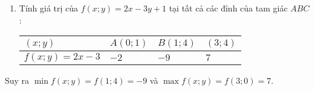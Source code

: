 \begin{ex}
{\begin{enumerate}[--]
\begin{enumerate}[+]
        \item $\big\{B\big\}=d_1 \cap d_2$ nên tọa độ của nó là nghiệm của hệ $\heva{&3x-y=-1\\&2x+y=6} \Leftrightarrow \heva{&x=1\\&y=4}$. Vậy $B(1;4)$.\\
        \item $\big\{C\big\}=d_2 \cap d_3$ nên tọa độ của nó là nghiệm của hệ $\heva{&2x+y=6\\&x+3y=3} \Leftrightarrow \heva{&x=3\\&y=0}$. Vậy $C(3;0)$.\\      
        \end{enumerate}
        \item Tính giá trị của $f(x;y)=2x-3y+1$ tại tất cả các đỉnh của tam giác $ABC$:
        \begin{center}
            \begin{tabular}{|>{\centering\arraybackslash}p{3cm}|>{\centering\arraybackslash}p{3cm}|>{\centering\arraybackslash}p{3cm}|>{\centering\arraybackslash}p{3cm}|}
                \hline
                $(x;y)$&$A(0;1)$  &$B(1;4)$  & $(3;4)$ \\
                \hline
                $f(x;y)=2x-3$&$-2$  &$-9$  &$7$  \\
                \hline
            \end{tabular}
        \end{center}    
    \end{enumerate}
        Suy ra $\min f(x;y)=f(1;4)=-9$ và $\max f(x;y)=f(3;0)=7$.
    }
\end{ex}
